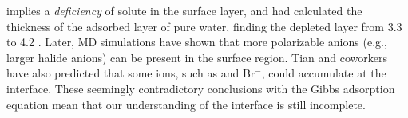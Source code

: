 implies a \emph{deficiency} of solute in the surface layer\cite{Jarvis1968},
and had calculated the thickness of the adsorbed layer of pure water, finding 
the depleted layer from 3.3 to 4.2 \A.
Later, MD simulations have shown that more polarizable anions (e.g., larger halide anions) 
can be present in the surface region\cite{Jungwirth2001,Jungwirth2002}. 
Tian and coworkers\cite{TianCS2011} have also predicted that some ions, such as \I and Br$^{-}$, could accumulate at the interface.
These seemingly contradictory conclusions with the Gibbs adsorption equation mean that our understanding of the interface is still incomplete. 

%

